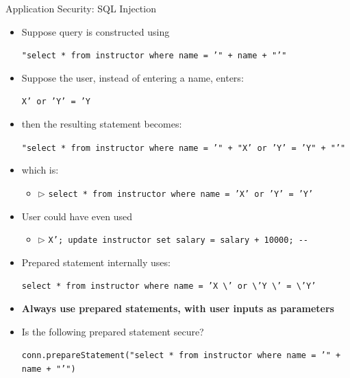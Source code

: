 \documentclass[aspectratio=169, xcolor=dvipsnames]{beamer}
\begin{document}
\begin{frame}[fragile]{Application Security: SQL Injection}
    \begin{itemize}
        \item Suppose query is constructed using
        \begin{center}\texttt{"select * from instructor where name = '" + name + "'"}\end{center}
        \item Suppose the user, instead of entering a name, enters:
        \begin{center}\texttt{X' or 'Y' = 'Y}\end{center}
        \item then the resulting statement becomes:
        \begin{center}\texttt{"select * from instructor where name = '" + "X' or 'Y' = 'Y" + "'"}\end{center}
        \item which is:
        \begin{itemize}
            \item $\triangleright$ \texttt{select * from instructor where name = 'X' or 'Y' = 'Y'}
        \end{itemize}
        \item User could have even used
        \begin{itemize}
            \item $\triangleright$ \texttt{X'; update instructor set salary = salary + 10000; -{}-}
        \end{itemize}
        \item Prepared statement internally uses:
        \begin{center}\texttt{select * from instructor where name = 'X \textbackslash' or \textbackslash'Y \textbackslash' = \textbackslash'Y'}\end{center}
        \item \textbf{Always use prepared statements, with user inputs as parameters}
        \item Is the following prepared statement secure?
        \begin{center}\texttt{conn.prepareStatement("select * from instructor where name = '" + name + "'")}\end{center}
    \end{itemize}
\end{frame}
\end{document}
